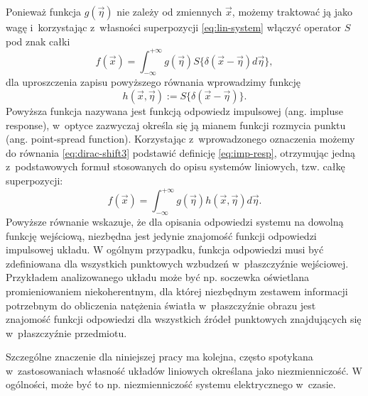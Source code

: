 Ponieważ funkcja $g(\vec{\eta})$ nie zależy od zmiennych $\vec{x}$, możemy traktować ją jako wagę i~korzystając z~własności superpozycji \ref{eq:lin-system} włączyć operator $S{}$ pod znak całki
\begin{equation}
f(\vec{x})=\int_{-\infty}^{+\infty} g(\vec{\eta})  S\{\delta(\vec{x}-\vec{\eta}) d \vec{\eta} \},
\label{eq:dirac-shift3}
\end{equation}
dla uproszczenia zapisu powyższego równania wprowadzimy funkcję
\begin{equation}
h(\vec{x},\vec{\eta}):=S\{\delta(\vec{x}-\vec{\eta})\}.
\label{eq:imp-resp}
\end{equation}
Powyższa funkcja nazywana jest funkcją odpowiedz impulsowej (ang. impluse response), w~optyce zazwyczaj określa się ją mianem funkcji rozmycia punktu (ang. point-spread function). Korzystając z~wprowadzonego oznaczenia możemy do równania \ref{eq:dirac-shift3}  podstawić definicję \ref{eq:imp-resp}, otrzymując jedną z~podstawowych formuł stosowanych do opisu systemów liniowych, tzw. całkę superpozycji:
\begin{equation}
f(\vec{x})=\int_{-\infty}^{+\infty} g(\vec{\eta})  h(\vec{x},\vec{\eta}) d \vec{\eta} .
\label{eq:sup-int}
\end{equation}
Powyższe równanie wskazuje, że dla opisania odpowiedzi systemu na dowolną funkcję wejściową, niezbędna jest jedynie znajomość funkcji odpowiedzi impulsowej układu. W ogólnym przypadku, funkcja odpowiedzi musi być zdefiniowana dla wszystkich punktowych wzbudzeń w~płaszczyźnie wejściowej. Przykładem analizowanego układu może być np. soczewka oświetlana promieniowaniem niekoherentnym, dla której niezbędnym zestawem informacji potrzebnym do obliczenia natężenia światła w~płaszczyźnie obrazu jest znajomość funkcji odpowiedzi dla wszystkich źródeł punktowych znajdujących się w~płaszczyźnie przedmiotu. 

Szczególne znaczenie dla niniejszej pracy ma kolejna, często spotykana w~zastosowaniach własność układów liniowych określana jako niezmienniczość. W ogólności, może być to np. niezmienniczość systemu elektrycznego w~czasie. 

